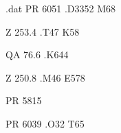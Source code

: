\begin{filecontents*}{\jobname.dat}
PR
6051
.D3352
M68

Z
253.4
.T47
K58

QA
76.6
.K644

Z
250.8
.M46
E578

PR
5815

PR
6039
.O32
T65
\end{filecontents*}
\documentclass[letterpaper,10pt]{article}

\usepackage[newdimens]{labels}
\LeftPageMargin=4mm
\RightPageMargin=4mm
\TopPageMargin=12.5mm
\BottomPageMargin=13mm
\InterLabelColumn=4mm
\InterLabelRow=0mm
\LeftLabelBorder=0.2mm
\RightLabelBorder=0.2mm
\TopLabelBorder=0.2mm
\BottomLabelBorder=0mm

\LabelGridtrue %
\LabelInfotrue %



